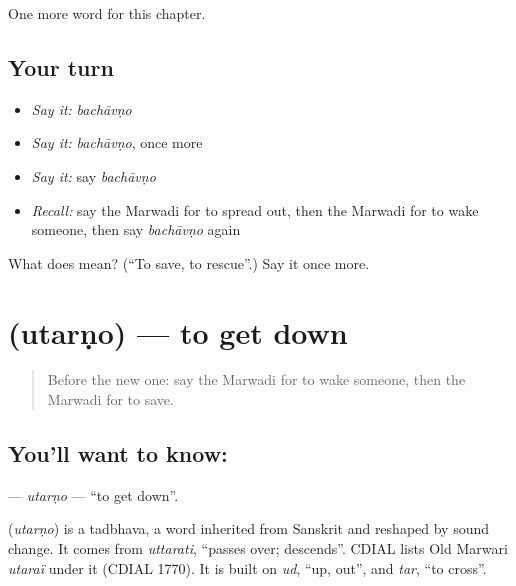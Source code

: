 \begin{grammarlens}[title={What you've built}]
One more word for this chapter.
\end{grammarlens}

\subsection*{Your turn}
\begin{itemize}
\raggedright
  \item \emph{Say it:} \emph{bachāvṇo}
  \item \emph{Say it:} \emph{bachāvṇo}, once more
  \item \emph{Say it:} say \emph{bachāvṇo}
  \item \emph{Recall:} say the Marwadi for to spread out, then the Marwadi for to wake someone, then say \emph{bachāvṇo} again
\end{itemize}

\begin{tcolorbox}[breakable,colback=teal!4,colframe=teal!35!black,title={Before you move on}]
What does  mean? (\textquotedblleft{}To save, to rescue\textquotedblright{}.) Say it once more.
\end{tcolorbox}
\section[\texorpdfstring{\mw{उतरणो} (utarṇo)}{उतरणो (utarṇo)}]{ (utarṇo) — to get down}

\label{lesson:MW-C108-utarno}



\begin{quote}
Before the new one: say the Marwadi for to wake someone, then the Marwadi for to save.
\end{quote}

\subsection*{You'll want to know: }
\textbf{} — \emph{utarṇo} — \textquotedblleft{}to get down\textquotedblright{}.

\begin{cousinweb}
\textbf{} (\emph{utarṇo}) is a tadbhava, a word inherited from Sanskrit and reshaped by sound change. It comes from \emph{uttarati}, \textquotedblleft{}passes over; descends\textquotedblright{}. CDIAL lists Old Marwari \emph{utaraï} under it (CDIAL 1770). It is built on \emph{ud}, \textquotedblleft{}up, out\textquotedblright{}, and \emph{tar}, \textquotedblleft{}to cross\textquotedblright{}.
\end{cousinweb}

